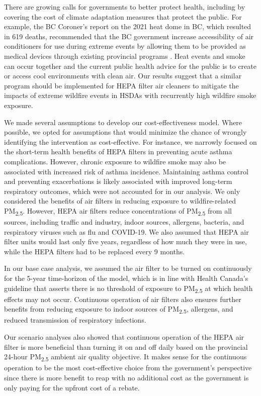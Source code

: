 \documentclass[
  number]{elsarticle}
\begin{document}
There are growing calls for governments to better protect health,
including by covering the cost of climate adaptation measures that
protect the public. For example, the BC Coroner's report on the 2021
heat dome in BC, which resulted in 619 deaths, recommended that the BC
government increase accessibility of air conditioners for use during
extreme events by allowing them to be provided as medical devices
through existing provincial programs \citep{thebccoronersservice2022}.
Heat events and smoke can occur together and the current public health
advice for the public is to create or access cool environments with
clean air. Our results suggest that a similar program should be
implemented for HEPA filter air cleaners to mitigate the impacts of
extreme wildfire events in HSDAs with recurrently high wildfire smoke
exposure.

We made several assumptions to develop our cost-effectiveness model.
Where possible, we opted for assumptions that would minimize the chance
of wrongly identifying the intervention as cost-effective. For instance,
we narrowly focused on the short-term health benefits of HEPA filters in
preventing acute asthma complications. However, chronic exposure to
wildfire smoke may also be associated with increased risk of asthma
incidence. Maintaining asthma control and preventing exacerbations is
likely associated with improved long-term respiratory outcomes, which
were not accounted for in our analysis. We only considered the benefits
of air filters in reducing exposure to wildfire-related
PM\textsubscript{2.5}. However, HEPA air filters reduce concentrations
of PM\textsubscript{2.5} from all sources, including traffic and
industry, indoor sources, allergens, bacteria, and respiratory viruses
such as flu and COVID-19. We also assumed that HEPA air filter units
would last only five years, regardless of how much they were in use,
while the HEPA filters had to be replaced every 9 months.

In our base case analysis, we assumed the air filter to be turned on
continuously for the 5-year time-horizon of the model, which is in line
with Health Canada's guideline that asserts there is no threshold of
exposure to PM\textsubscript{2.5} at which health effects may not
occur\citep{healthcanada2012}. Continuous operation of air filters also
ensures further benefits from reducing exposure to indoor sources of
PM\textsubscript{2.5}, allergens, and reduced transmission of
respiratory infections.

Our scenario analyses also showed that continuous operation of the HEPA
air filter is more beneficial than turning it on and off daily based on
the provincial 24-hour PM\textsubscript{2.5} ambient air quality
objective. It makes sense for the continuous operation to be the most
cost-effective choice from the government's perspective since there is
more benefit to reap with no additional cost as the government is only
paying for the upfront cost of a rebate.
\end{document}
